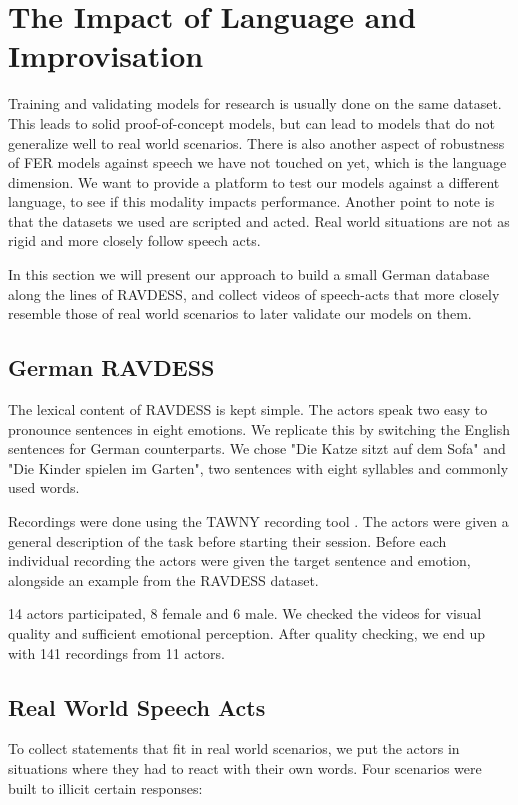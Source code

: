 \section{The Impact of Language and Improvisation}
\label{sec:data}
Training and validating models for research is usually done on the same dataset. This leads to solid proof-of-concept models, but can lead to models that do not generalize well to real world scenarios. There is also another aspect of robustness of FER models against speech we have not touched on yet, which is the language dimension. We want to provide a platform to test our models against a different language, to see if this modality impacts performance. Another point to note is that the datasets we used are scripted and acted. Real world situations are not as rigid and more closely follow speech acts.

In this section we will present our approach to build a small German database along the lines of RAVDESS, and collect videos of speech-acts that more closely resemble those of real world scenarios to later validate our models on them.

\subsection{German RAVDESS}
\label{sec:german}

The lexical content of RAVDESS is kept simple. The actors speak two easy to pronounce sentences in eight emotions. We replicate this by switching the English sentences for German counterparts. We chose "Die Katze sitzt auf dem Sofa" and "Die Kinder spielen im Garten", two sentences with eight syllables and commonly used words. 

Recordings were done using the TAWNY recording tool \cite{tawny2021}. The actors were given a general description of the task before starting their session. Before each individual recording the actors were given the target sentence and emotion, alongside an example from the RAVDESS dataset.

14 actors participated, 8 female and 6 male. We checked the videos for visual quality and sufficient emotional perception. After quality checking, we end up with 141 recordings from 11 actors.

\subsection{Real World Speech Acts}

To collect statements that fit in real world scenarios, we put the actors in situations where they had to react with their own words. Four scenarios were built to illicit certain responses:

